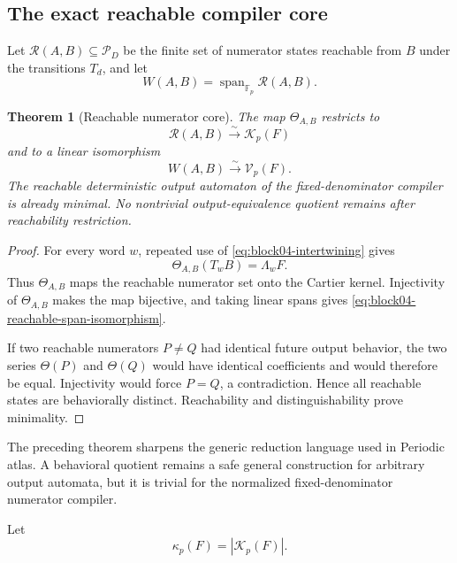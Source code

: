 \documentclass[11pt]{article}
\newtheorem{theorem}{Theorem}[section]
\theoremstyle{definition}
\theoremstyle{remark}
\begin{document}
\subsection{The exact reachable compiler core}

Let \(\mathcal R(A,B)\subseteq\mathcal P_D\) be the finite set of numerator states reachable from \(B\) under the transitions \(T_d\), and let
\[
W(A,B)=\operatorname{span}_{\mathbb F_p}\mathcal R(A,B).
\]

\begin{theorem}[Reachable numerator core]
\label{thm:reachable-numerator-core}
The map \(\Theta_{A,B}\) restricts to
\begin{equation}
\label{eq:block04-reachable-bijections}
\mathcal R(A,B)
\overset{\sim}{\longrightarrow}
\mathcal K_p(F)
\end{equation}
and to a linear isomorphism
\begin{equation}
\label{eq:block04-reachable-span-isomorphism}
W(A,B)
\overset{\sim}{\longrightarrow}
\mathcal V_p(F).
\end{equation}
The reachable deterministic output automaton of the fixed-denominator compiler is already minimal.  No nontrivial output-equivalence quotient remains after reachability restriction.
\end{theorem}

\begin{proof}
For every word \(w\), repeated use of \cref{eq:block04-intertwining} gives
\[
\Theta_{A,B}(T_wB)=\Lambda_wF.
\]
Thus \(\Theta_{A,B}\) maps the reachable numerator set onto the Cartier kernel.  Injectivity of \(\Theta_{A,B}\) makes the map bijective, and taking linear spans gives \cref{eq:block04-reachable-span-isomorphism}.

If two reachable numerators \(P\neq Q\) had identical future output behavior, the two series \(\Theta(P)\) and \(\Theta(Q)\) would have identical coefficients and would therefore be equal.  Injectivity would force \(P=Q\), a contradiction.  Hence all reachable states are behaviorally distinct.  Reachability and distinguishability prove minimality.
\end{proof}

The preceding theorem sharpens the generic reduction language used in Periodic atlas.  A behavioral quotient remains a safe general construction for arbitrary output automata, but it is trivial for the normalized fixed-denominator numerator compiler.

Let
\begin{equation}
\label{eq:block04-kernel-size}
\kappa_p(F)=|\mathcal K_p(F)|.
\end{equation}
\end{document}

